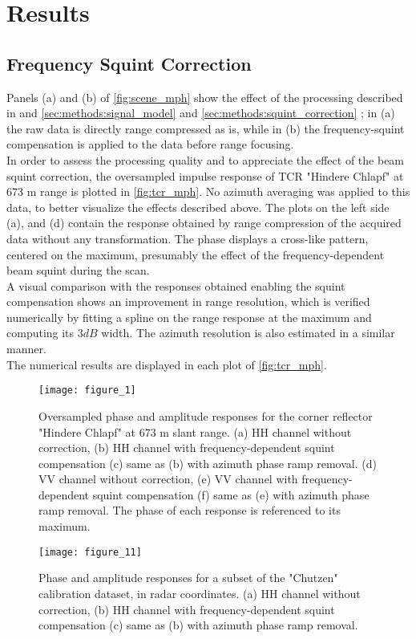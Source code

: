 \section{Results}\label{sec:results}
\subsection{Frequency Squint Correction}\label{sec:results:squint_correction}
Panels (a) and (b) of \autoref{fig:scene_mph} show the effect of the processing described in and \autoref{sec:methods:signal_model} and \autoref{sec:methods:squint_correction} ; in (a) the raw data is directly range compressed as is, while in (b) the frequency-squint compensation is applied to the data before range focusing.\\ 
In order to assess the processing quality and to appreciate the effect of the beam squint correction,  the oversampled impulse response of  TCR "Hindere Chlapf" at 673 m range is plotted in \autoref{fig:tcr_mph}. No azimuth averaging was applied to this data, to better visualize the effects described above. The plots on the left side (a), and (d) contain the response obtained by range compression of the acquired data without any transformation. The phase displays a cross-like pattern, centered on the maximum, presumably the effect of the frequency-dependent beam squint during the scan.\\ A visual comparison with the responses obtained enabling the squint compensation shows an improvement in range resolution, which is verified numerically by fitting a spline on the range response at the maximum and computing its $3 dB$ width. The azimuth resolution is also estimated in a similar manner.\\ The numerical results are displayed in each plot of \autoref{fig:tcr_mph}.
\begin{figure*}[ht]
	\centering
	\texttt{[image: figure\_1]}
	\caption{Oversampled phase and amplitude responses for the corner reflector "Hindere Chlapf" at 673 m slant range. (a) HH channel without correction, (b) HH channel with frequency-dependent squint compensation (c) same as (b) with azimuth phase ramp removal. (d) VV channel without correction, (e) VV channel with frequency-dependent squint compensation (f) same as (e) with azimuth phase ramp removal.
	The phase of each response is referenced to its maximum.}
	\label{fig:tcr_mph}
\end{figure*}

\begin{figure*}[ht]
	\centering
	\texttt{[image: figure\_11]}
	\caption{Phase and amplitude responses for a subset of the "Chutzen" calibration dataset, in radar coordinates. (a) HH channel without correction, (b) HH channel with frequency-dependent squint compensation (c) same as (b) with azimuth phase ramp removal.}
	\label{fig:scene_mph}
\end{figure*}


